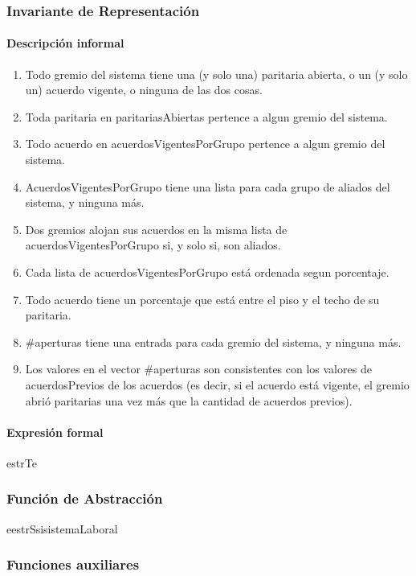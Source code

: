 \subsubsection{Invariante de Representaci\'on}

\paragraph{Descripción informal \\}
\begin{enumerate}

	\item Todo gremio del sistema tiene una (y solo una) paritaria abierta, o un (y solo un) acuerdo vigente, o ninguna de las dos cosas.
	\item Toda paritaria en paritariasAbiertas pertence a algun gremio del sistema.
	\item Todo acuerdo en acuerdosVigentesPorGrupo pertence a algun gremio del sistema.
	\item AcuerdosVigentesPorGrupo tiene una lista para cada grupo de aliados del sistema, y ninguna más.
	\item Dos gremios alojan sus acuerdos en la misma lista de acuerdosVigentesPorGrupo si, y solo si, son aliados.
	\item Cada lista de acuerdosVigentesPorGrupo está ordenada segun porcentaje.
	\item Todo acuerdo tiene un porcentaje que está entre el piso y el techo de su paritaria.
	\item \#aperturas tiene una entrada para cada gremio del sistema, y ninguna más.
	\item Los valores en el vector \#aperturas son consistentes con los valores de acuerdosPrevios de los acuerdos (es decir, si el acuerdo está vigente, el gremio abrió paritarias una vez más que la cantidad de acuerdos previos).

\end{enumerate}

\paragraph{Expresión formal \\}
\begin{RepFormal}{estrT}{e}
\end{RepFormal}

\subsubsection{Funci\'on de Abstracci\'on}

\begin{FunAbsDescriptiva}{e}{estrS}{si}{sistemaLaboral}


\end{FunAbsDescriptiva}

\subsubsection{Funciones auxiliares}
